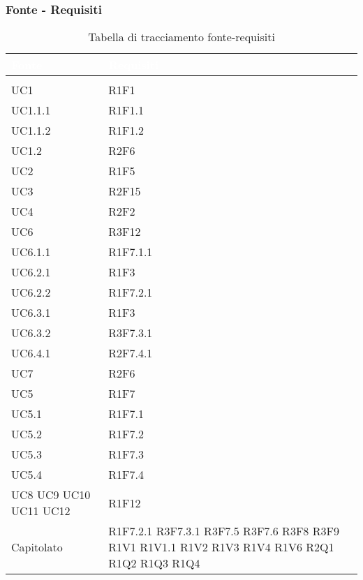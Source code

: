 \subsubsection{Fonte - Requisiti}
\renewcommand{\arraystretch}{1.5}
\begin{center}
\begin{longtable}{C{6cm} C{6cm}}
		\textcolor{white}{\textbf{Fonte}} & 
		\textcolor{white}{\textbf{Requisiti}}\\
		\endfirsthead
	    \\
	    \endfoot
	    \caption{Tabella di tracciamento fonte-requisiti}
	    \endlastfoot

UC1 &  	R1F1\\
UC1.1.1 & R1F1.1\\
UC1.1.2 & R1F1.2\\
UC1.2 & R2F6\\
UC2 & R1F5\\
UC3 & R2F15\\
UC4 & R2F2\\
UC6 & R3F12\\
UC6.1.1 & R1F7.1.1\\
UC6.2.1 & R1F3\\
UC6.2.2 & R1F7.2.1\\
UC6.3.1 & R1F3\\
UC6.3.2 & R3F7.3.1\\
UC6.4.1 & R2F7.4.1\\
UC7 & R2F6\\
UC5 & R1F7\\
UC5.1 & R1F7.1\\
UC5.2 & R1F7.2\\
UC5.3 & R1F7.3\\
UC5.4 & R1F7.4\\
			  
UC8 \newline UC9 \newline UC10 \newline UC11 \newline UC12 & R1F12 \\

Capitolato &  	R1F7.2.1 \newline
				R3F7.3.1 \newline
				R3F7.5 \newline
				R3F7.6 \newline
				R3F8 \newline
				R3F9 \newline
				R1V1 \newline
				R1V1.1 \newline
				R1V2 \newline
				R1V3 \newline
				R1V4 \newline
				R1V6 \newline
				R2Q1 \newline
				R1Q2 \newline
				R1Q3 \newline
				R1Q4 \\


\end{longtable}
\end{center}

